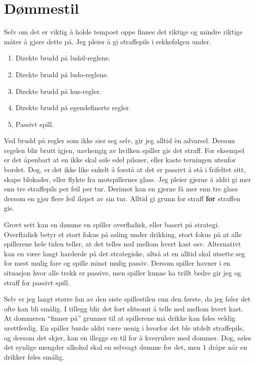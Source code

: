 \documentclass[10pt,a4paper,norsk,openany]{book}
\begin{document}
\section{Dømmestil}

Selv om det er viktig å holde tempoet oppe finnes det riktige og mindre riktige
måter å gjøre dette på. Jeg pleier å gi straffepils i rekkefølgen under.

\begin{enumerate}
  \item Direkte brudd på ludøl-reglene.
  \item Direkte brudd på ludo-reglene.
  \item Direkte brudd på hus-regler.
  \item Direkte brudd på egendefinerte regler.
  \item Passivt spill.
\end{enumerate}

Ved brudd på regler som ikke sier seg selv, gir jeg alltid èn advarsel. Dersom
regelen blir brutt igjen, uavhengig av hvilken spiller gis det straff. For
eksempel er det åpenbart at en ikke skal søle edel pilsner, eller kaste
terningen utenfor bordet. Dog, er det ikke like enkelt å forstå at det er
passivt å stå i frifeltet sitt, skape blokader, eller flykte fra motspillernes
glass. Jeg pleier gjerne å aldri gi mer enn tre straffepils per feil per tur.
Derimot kan en gjerne få mer enn tre glass dersom en gjør flere feil iløpet av
sin tur. Alltid gi grunn for straff \textbf{før} straffen gis.

Grovt sett kan en dømme en spiller overfladisk, eller basert på strategi.
Overfladisk betyr et stort fokus på søling under drikking, stort fokus på at
alle spillerene hele tiden teller, at det telles ned mellom hvert kast osv.
Alternativt kan en være langt harderde på det strategiske, altså at en alltid
skal utsette seg for mest mulig fare og spille minst mulig passiv. Dersom spiller
havner i en situasjon hvor alle trekk er passive, men spiller kunne ha trillt
bedre gir jeg og straff for passivt spill.

Selv er jeg langt større fan av den siste spillestilen enn den første, da jeg
føler det ofte kan bli smålig. I tillegg blir det fort slitsomt å telle ned
mellom hvert kast. At dommeren ``finner på'' grunner til at spillerene må drikke
kan føles veldig urettferdig. En spiller burde aldri være uenig i hvorfor det
ble utdelt straffepils, og dersom det skjer, kan en illegge en til for å
kverrulere med dommer. Dog, søles det synlige mengder alkohol skal en selvsagt
dømme for det, men 1 dråpe når en drikker føles smålig. 
\end{document}
